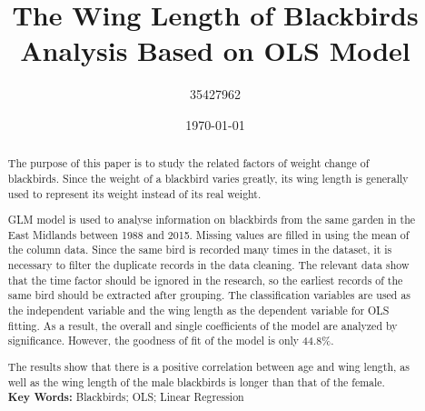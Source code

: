 \documentclass[a4paper,11pt,conference]{IEEEtran}
\title{\textbf{The Wing Length of Blackbirds Analysis Based on OLS Model}}
\author{35427962}
\date{\today}
\begin{document}
\maketitle

\begin{abstract}
    The purpose of this paper is to study the related factors of weight change of blackbirds. Since the weight of a blackbird varies greatly, its wing length is generally used to represent its weight instead of its real weight.

    GLM model is used to analyse information on blackbirds from the same garden in the East Midlands between 1988 and 2015. Missing values are filled in using the mean of the column data. Since the same bird is recorded many times in the dataset, it is necessary to filter the duplicate records in the data cleaning. The relevant data show that the time factor should be ignored in the research, so the earliest records of the same bird should be extracted after grouping. The classification variables are used as the independent variable and the wing length as the dependent variable for OLS fitting. As a result, the overall and single coeﬀicients of the model are analyzed by significance. However, the goodness of fit of the model is only 44.8\%.

    The results show that there is a positive correlation between age and wing length, as well as the wing length of the male blackbirds is longer than that of the female.\\

    \noindent \textbf{Key Words:} Blackbirds; OLS; Linear Regression
  \end{abstract}









\nocite{*}




\clearpage



\clearpage

 
\end{document}
